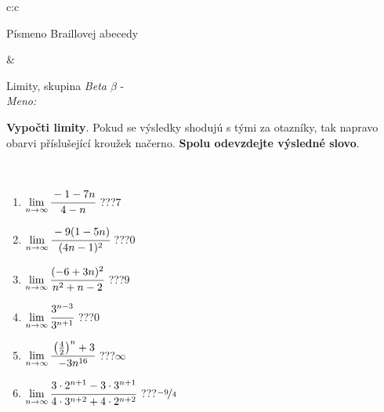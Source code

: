 \documentclass[10pt]{report}
\begin{document}
\begin{tabular}{c:c}
\begin{minipage}[c][104.5mm][t]{0.5\linewidth}
\begin{center}
\begin{minipage}{0.20\linewidth}
\begin{center}
{\small Písmeno Braillovej abecedy}
\end{center}
\end{minipage}
\end{center}
\end{minipage}
&
\begin{minipage}[c][104.5mm][t]{0.5\linewidth}
\begin{center}
\vspace{7mm}
{\huge Limity, skupina \textit{Beta $\beta$} -}\\[5mm]
\textit{Meno:}\phantom{xxxxxxxxxxxxxxxxxxxxxxxxxxxxxxxxxxxxxxxxxxxxxxxxxxxxxxxxxxxxxxxxx}\\[5mm]
\begin{minipage}{0.95\linewidth}
\begin{center}
\textbf{Vypočti limity}. Pokud se výsledky shodujú s tými za otazníky, tak napravo\\obarvi příslušející kroužek načerno. \textbf{Spolu odevzdejte výsledné slovo}.
\end{center}
\end{minipage}
\\[1mm]
\begin{minipage}{0.79\linewidth}
\begin{center}
\begin{varwidth}{\linewidth}
\begin{enumerate}
\normalsize
\item $\lim\limits_{n\to\infty}\cfrac{-1-7n}{4-n}$\quad \dotfill\; ???\;\dotfill \quad $7$
\item $\lim\limits_{n\to\infty}\cfrac{-9(1-5n)}{(4n-1)^2}$\quad \dotfill\; ???\;\dotfill \quad $0$
\item $\lim\limits_{n\to\infty}\cfrac{(-6+3n)^2}{n^2+n-2}$\quad \dotfill\; ???\;\dotfill \quad $9$
\item $\lim\limits_{n\to\infty}\cfrac{3^{n-3}}{3^{n+1}}$\quad \dotfill\; ???\;\dotfill \quad $0$
\item $\lim\limits_{n\to\infty}\cfrac{\left(\frac{4}{2}\right)^n +3}{-3n^{16}}$\quad \dotfill\; ???\;\dotfill \quad $\infty$
\item $\lim\limits_{n\to\infty}\cfrac{3\cdot 2^{n+1}-3\cdot 3^{n+1}}{4\cdot 3^{n+2}+4\cdot 2^{n+2}}$\quad \dotfill\; ???\;\dotfill \quad $\nicefrac{-9}{4}$
\end{enumerate}
\end{varwidth}
\end{center}
\end{minipage}
\begin{minipage}{0.20\linewidth}

\end{minipage}
\end{center}
\end{minipage}
\end{tabular}
\end{document}
